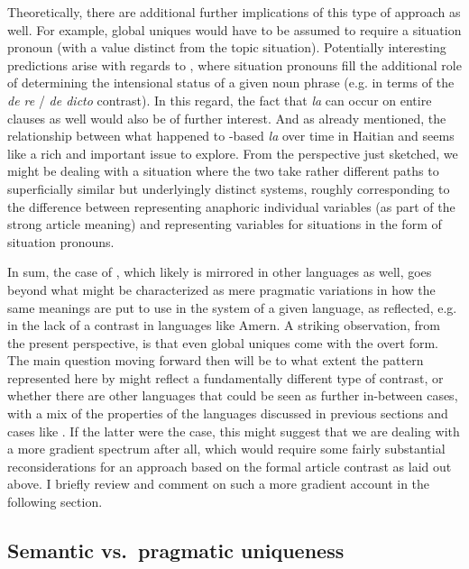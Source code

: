 \documentclass[output=paper
,modfonts
,nonflat]{langscibook}
\begin{document}
Theoretically, there are additional further implications of this type
of approach as well. For example, global uniques would have to be
assumed to require a situation pronoun (with a value distinct from the
topic situation). Potentially interesting predictions arise with
regards to , where situation pronouns fill the
additional role of determining the intensional status of a
given noun phrase (e.g. in terms of the \textit{de re} / \textit{de dicto}
contrast). In this regard, the fact that \textit{la} can occur on
entire clauses as well would also be of further interest. And as
already mentioned, the relationship between what happened to
-based \textit{la} over time in Haitian and 
seems like a rich and important issue to explore. From the perspective
just sketched, we might be dealing with a situation where the two take
rather different paths to superficially similar but underlyingly
distinct systems, roughly corresponding to the difference between
representing anaphoric individual variables (as part of the strong
article meaning) and representing variables for situations in the form
of situation pronouns.

In sum, the case of , which likely is mirrored in other
languages as well, goes beyond what might be characterized as mere
pragmatic variations in how the same meanings are put to use in the
system of a given language, as reflected, e.g. in the lack of a
 contrast in languages like Amern. A striking observation, from the
present perspective, is that even global uniques come with the overt
form. The main question moving forward then will be to what extent the
pattern represented here by  might reflect a
fundamentally different type of contrast, or whether there are other
languages that could be seen as further in-between cases, with a mix of
the properties of the languages discussed in previous sections and
cases like . If the latter were the case, this might
suggest that we are dealing with a more gradient spectrum after all,
which would require some fairly substantial reconsiderations for an
approach based on the formal article contrast as laid out above. I
briefly review and comment on such a more gradient account in the
following section.

\subsection{Semantic vs.\ pragmatic uniqueness}
\end{document}

